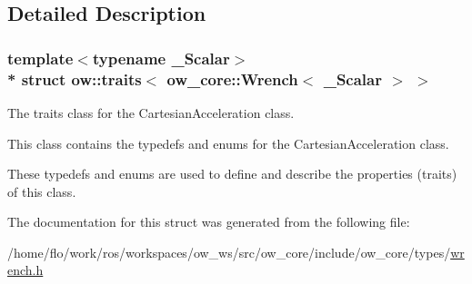 \subsection{Detailed Description}
\subsubsection*{template$<$typename \+\_\+\+Scalar$>$\\*
struct ow\+::traits$<$ ow\+\_\+core\+::\+Wrench$<$ \+\_\+\+Scalar $>$ $>$}

The traits class for the Cartesian\+Acceleration class. 

This class contains the typedefs and enums for the Cartesian\+Acceleration class.

These typedefs and enums are used to define and describe the properties (traits) of this class. 

The documentation for this struct was generated from the following file\+:\begin{DoxyCompactItemize}
\item 
/home/flo/work/ros/workspaces/ow\+\_\+ws/src/ow\+\_\+core/include/ow\+\_\+core/types/\hyperlink{wrench_8h}{wrench.\+h}\end{DoxyCompactItemize}
